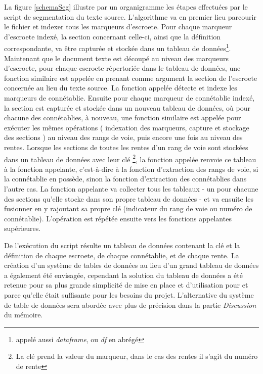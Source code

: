 La figure \ref{schemaSeg} illustre par un organigramme les étapes effectuées par le script de segmentation du texte source.
L’algorithme va en premier lieu parcourir le fichier et indexer tous les marqueurs d'escroete. Pour chaque marqueur d'escroete indexé, la section concernant celle-ci, ainsi que la définition correspondante, va être capturée et stockée dans un tableau de données\footnote{appelé aussi \textit{dataframe}, ou \textit{df} en abrégé}. Maintenant que le document texte est découpé au niveau des marqueurs d'escroete, pour chaque escroete répertoriée dans le tableau de données, une fonction similaire est appelée  en prenant comme argument la section de l'escroete concernée au lieu du texte source.
La fonction appelée détecte et indexe les marqueurs de connétablie. 
Ensuite pour chaque marqueur de connétablie indexé, la section est capturée et stockée dans un nouveau tableau de données, où pour chacune des connétablies, à nouveau, une fonction similaire est appelée pour exécuter les mêmes opérations ( indexation des marqueurs, capture et stockage des sections ) au niveau des rangs de voie, puis encore une fois au niveau des rentes.
Lorsque les sections de toutes les rentes d'un rang de voie sont stockées dans un tableau de données avec leur clé
\footnote{La clé prend la valeur du marqueur, dans le cas des rentes il s'agit du numéro de rente}, 
la fonction appelée renvoie ce tableau à la fonction appelante, c’est-à-dire à la fonction d'extraction des rangs de voie, si la connétablie en possède, sinon la fonction d'extraction des connétablies dans l'autre cas. La fonction appelante va collecter tous les tableaux - un pour chacune des sections qu'elle stocke dans son propre tableau de données - et va ensuite les fusionner en y rajoutant sa propre clé (indicateur du rang de voie ou numéro de connétablie). L'opération est répétée ensuite vers les fonctions appelantes supérieures.

De l'exécution du script résulte un tableau de données contenant la clé et la définition de chaque escroete, de chaque connétablie, et de chaque rente. La création d'un système de tables de données au lieu d'un grand tableau de données a également été envisagée, cependant la solution du tableau de données a été retenue pour sa plus grande simplicité de mise en place et d'utilisation pour et parce qu'elle était suffisante pour les besoins du projet. L'alternative du système de table de données sera abordée avec plus de précision  dans la partie \textit{Discussion} du mémoire.

